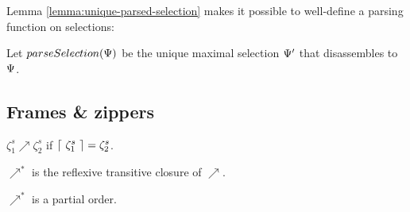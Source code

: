 Lemma \ref{lemma:unique-parsed-selection} makes it
possible to well-define a parsing function
on selections:
\begin{definition}
  Let $parseSelection(\Psi)$ be
  the unique maximal selection $\Psi'$ that disassembles
  to $\Psi$.
\end{definition}










\subsection{Frames \& zippers}





\begin{definition}
  $\zeta^s_1\nearrow\zeta^s_2$ if $\left\lceil~\zeta^s_1~\right\rceil = \zeta^s_2$.
\end{definition}

\begin{definition}
  $\nearrow^*$ is the reflexive transitive closure of $\nearrow$.
\end{definition}

\begin{lemma}
  $\nearrow^*$ is a partial order.
\end{lemma}

